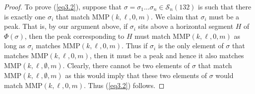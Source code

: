 \documentclass[
final,nomarks
]{dmtcs-episciences}
\newcommand{\Sn}[1]{\mathcal{S}_{#1}}
\newcommand{\MMP}{\mathrm{MMP}}
\begin{document}
\begin{proof}
	To prove (\ref{eq3.2}), 
	suppose that \begin{math}\sigma = \sigma_1 \ldots \sigma_n \in \Sn{n}(132)\end{math} is such that there is exactly one \begin{math}\sigma_i\end{math} 
	that  match 
	\begin{math}\MMP(k,\ell,0,m)\end{math}. We claim that \begin{math}\sigma_i\end{math} must be 
	a peak. That is, by our argument above, if \begin{math}\sigma_i\end{math} sits above a horizontal segment \begin{math}H\end{math} of \begin{math}\Phi(\sigma)\end{math}, then the peak corresponding 
	to \begin{math}H\end{math} must match \begin{math}\MMP(k,\ell,0,m)\end{math} as long as \begin{math}\sigma_i\end{math} matches \begin{math}\MMP(k,\ell,0,m)\end{math}. Thus if \begin{math}\sigma_i\end{math} is the only element 
	of \begin{math}\sigma\end{math} that matches \begin{math}\MMP(k,\ell,0,m)\end{math}, then it must be a peak and hence it also matches 
	\begin{math}\MMP(k,\ell,\emptyset,m)\end{math}. Clearly, there cannot be two elements of \begin{math}\sigma\end{math} that 
	match \begin{math}\MMP(k,\ell,\emptyset,m)\end{math} as
	this would imply that these two elements 
	of \begin{math}\sigma\end{math} would match \begin{math}\MMP(k,\ell,0,m)\end{math}. Thus (\ref{eq3.2}) follows. 
\end{proof}
\end{document}
